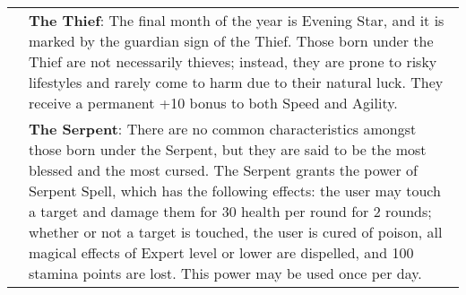 \begin{longtable}{lm{}}
\raisebox{-0.5\height}{\texttt{[image: Thief.png]}} & \textbf{The Thief}: The final month of the year is Evening Star, and it is marked by the guardian sign of the Thief. Those born under the Thief are not necessarily thieves; instead, they are prone to risky lifestyles and rarely come to harm due to their natural luck. They receive a permanent +10 bonus to both Speed and Agility.\\

\raisebox{-0.5\height}{\texttt{[image: Serpent.png]}} & \textbf{The Serpent}: There are no common characteristics amongst those born under the Serpent, but they are said to be the most blessed and the most cursed. The Serpent grants the power of Serpent Spell, which has the following effects: the user may touch a target and damage them for 30 health per round for 2 rounds; whether or not a target is touched, the user is cured of poison, all magical effects of Expert level or lower are dispelled, and 100 stamina points are lost. This power may be used once per day.\\
\end{longtable}